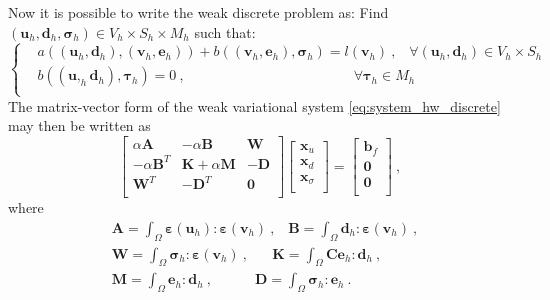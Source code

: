 \documentclass[preprint,12pt,authoryear]{elsarticle}
\begin{document}
Now it is possible to write the weak discrete problem as:   
Find $\left(\bm{u}_{h}, \bm{d}_{h},\bm{\sigma}_{h}\right)\in V_{h}\times S_{h}\times M_{h}$ such that:
\begin{equation} \label{eq:system_hw_discrete}
\left\lbrace
\begin{split}
& a( (\bm{u}_{h},\bm{d}_{h}), (\bm{v}_{h}, \bm{e}_{h}) ) 
+ b( (\bm{v}_{h}, \bm{e}_{h}), \bm{\sigma}_{h} ) = l(\bm{v}_{h})\:, 
\hspace{10pt} 
\forall \left(\bm{u}_{h},\bm{d}_{h}\right)\in V_{h} \times S_{h} \\
& b( (\bm{u},_{h}\bm{d}_{h}), \bm{\tau}_{h} ) = 0\:, 
\hspace{144pt} \forall\bm{\tau}_{h}\in M_{h} \\
\end{split}
\right.
\end{equation}
The matrix-vector form of the weak variational system \eqref{eq:system_hw_discrete} may then be written as  
\begin{equation}\label{eq:system_hu_discrete_matrix}
\left[
\begin{array}{ccc}
\alpha \bm{A} & -\alpha \bm{B} & \bm{W} \\
-\alpha \bm{B}^{T} & \bm{K}+\alpha \bm{M} & -\bm{D} \\
\bm{W}^{T}  & - \bm{D}^{T} & \bm{0} \\ 
\end{array}
\right] 
\left[
\begin{array}{c}
\bm{x}_{u} \\
\bm{x}_{d} \\
\bm{x}_{\sigma} \\
\end{array}
\right] =
\left[
\begin{array}{c}
\bm{b}_{f} \\
\bm{0} \\
\bm{0} \\
\end{array}
\right]\:,
\end{equation}
where
\begin{equation} 
\begin{split}
&\bm{A}=\int_{\Omega}\bm{\varepsilon}(\bm{u}_{h}):\bm{\varepsilon}(\bm{v}_{h})\:, \hspace{10pt} 
\bm{B}=\int_{\Omega}\bm{d}_{h}:\bm{\varepsilon}(\bm{v}_{h})\:, \\ 
&\bm{W}=\int_{\Omega}\bm{\sigma}_{h}:\bm{\varepsilon}(\bm{v}_{h})\:, \hspace{20pt}
\bm{K}=\int_{\Omega}\bm{C}\bm{e}_{h}:\bm{d}_{h}\:, \\
&\bm{M}=\int_{\Omega}\bm{e}_{h}:\bm{d}_{h}\:, \hspace{36pt}
\bm{D}=\int_{\Omega}\bm{\sigma}_{h}:\bm{e}_{h}\:.  
\end{split}
\end{equation}
\end{document}
